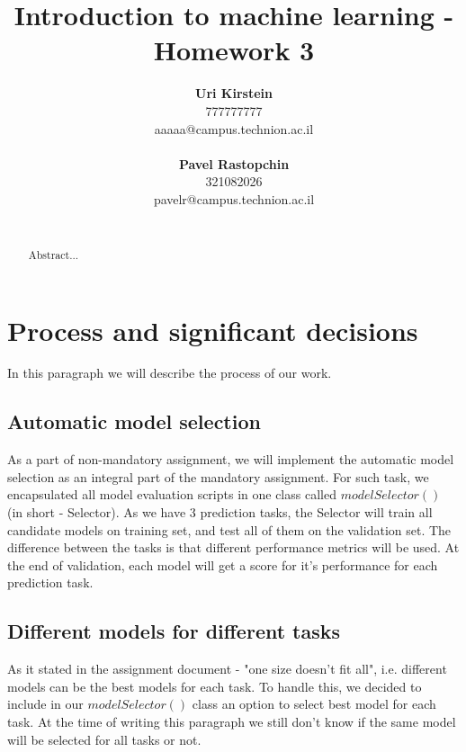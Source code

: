 \documentclass[12pt]{article}
\begin{document}
\title{\Large Introduction to machine learning - Homework 3}

\author{
  \textbf{Uri Kirstein}\\
  777777777 \\ aaaaa@campus.technion.ac.il
  \\ \\
  \textbf{Pavel Rastopchin}\\
  321082026 \\ pavelr@campus.technion.ac.il
  \\ \\ 
}

\maketitle


\begin{abstract}
Abstract...
\end{abstract}

\newpage
\section{Process and significant decisions}
In this paragraph we will describe the process of our work.
\subsection{Automatic model selection}
As a part of non-mandatory assignment, we will implement the automatic model selection as an integral part of the mandatory assignment. For such task, we encapsulated all model evaluation scripts in one class called $modelSelector()$ (in short - Selector). As we have 3 prediction tasks, the Selector will train all candidate models on training set, and test all of them on the validation set. The difference between the tasks is that different performance metrics will be used. At the end of validation, each model will get a score for it's performance for each prediction task.

\subsection{Different models for different tasks}
As it stated in the assignment document -  "one size doesn't fit all", i.e. different models can be the best models for each task. To handle this, we decided to include in our $modelSelector()$ class an option to select best model for each task. At the time of writing this paragraph we still don't know if the same model will be selected for all tasks or not.
\end{document}
